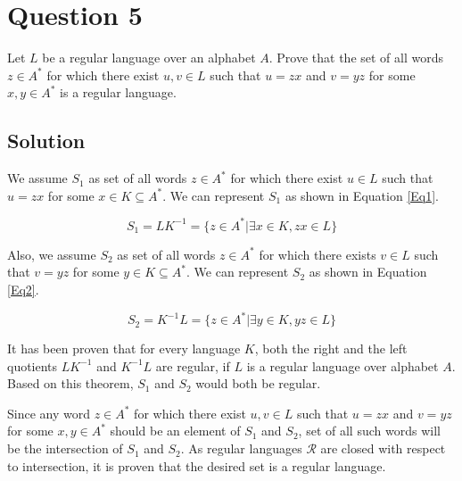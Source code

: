 
\section*{Question 5}

Let $L$ be a regular language over an alphabet $A$.
Prove that the set of all words $z \in A^*$ for which there exist $u,v \in L$ such that $u = zx$ and $v=yz$ for some $x,y \in A^*$ is a regular language.

\subsection*{Solution}

We assume $S_1$ as set of all words $z \in A^*$ for which there exist $u \in L$ such that $u=zx$ for some $x \in K \subseteq A^*$.
We can represent $S_1$ as shown in Equation \ref{Eq1}.

\begin{equation}\label{Eq1}
	S_1 = LK^{-1} = \{z\in A^* | \exists x\in K, zx\in L\}
\end{equation}

Also, we assume $S_2$ as set of all words $z \in A^*$ for which there exists $v \in L$ such that $v = yz$ for some $y \in K \subseteq A^*$.
We can represent $S_2$ as shown in Equation \ref{Eq2}.

\begin{equation}\label{Eq2}
	S_2 = K^{-1}L = \{z\in A^* | \exists y\in K, yz\in L\}
\end{equation}

It has been proven \cite{simovici1999theory} that for every language $K$, both the right and the left quotients $LK^{-1}$ and $K^{-1}L$ are regular, if $L$ is a regular language over alphabet $A$.
Based on this theorem, $S_1$ and $S_2$ would both be regular.

Since any word $z \in A^*$ for which there exist $u,v \in L$ such that $u = zx$ and $v=yz$ for some $x,y \in A^*$ should be an element of $S_1$ and $S_2$, set of all such words will be the intersection of $S_1$ and $S_2$.
As regular languages $\mathcal{R}$ are closed with respect to intersection, it is proven that the desired set is a regular language.
